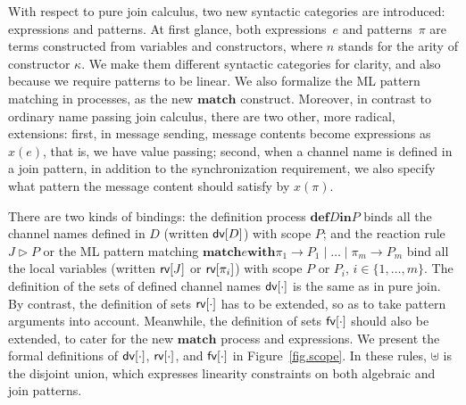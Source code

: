 \documentclass{LMCS}
\renewcommand{\exp}{e}
\newcommand{\const}{\kappa}
\newcommand{\pt}{\pi}
\newcommand{\kwd}[1]{\ensuremath{\mathbf{#1}}}
\newcommand{\prefix}[1]{\mathopen{}\mathrel{\kwd {#1}}}
\newcommand{\infix}[1]{\mathrel{\kwd {#1}}}
\newcommand{\set}[1]{\{#1\}}
\renewcommand{\_}{\mathord{\rule[-.25ex]{1ex}{.15ex}}}
\newcommand{\define}[2]{\prefix{def} #1 \infix{in} #2}
\newcommand{\matchfour}[4]{\prefix{match}  #1 \infix{with} #2_1
  \rightarrow #3_1 \mid \ldots \mid #2_{#4} \rightarrow #3_{#4}}
\newcommand{\reaction}[2]{#1 \triangleright #2}
\newcommand{\fv}[1]{\mbox{\sf fv}[#1]}
\newcommand{\dv}[1]{\mbox{\sf dv}[#1]}
\newcommand{\rv}[1]{\mbox{\sf rv}[#1]}
\begin{document}
With respect to pure join calculus, two new syntactic categories are
introduced: expressions and patterns.  At first glance, both
expressions~$e$ and patterns~$\pt$ are terms constructed from
variables and constructors, where $n$ stands for the arity of
constructor $\const$.  We make them different syntactic categories
for clarity, and also because we require patterns to be linear. We
also formalize the ML pattern matching in processes, as the new
\kwd{match} construct.  Moreover, in contrast to ordinary name passing
join calculus, there are two other, more radical, extensions: first,
in message sending, message contents become expressions as $x(\exp)$,
that is, we have value passing; second, when a channel name is defined
in a join pattern, in addition to the synchronization requirement, we
also specify what pattern the message content should satisfy by
$x(\pt)$.

There are two kinds of bindings: the definition process
$\define{D}{P}$ binds all the channel names defined in $D$ (written
$\dv{D}$) with scope $P$; and the reaction rule $\reaction{J}{P}$ or
the ML pattern matching $\matchfour{e}{\pi}{P}{m}$ bind all the local
variables (written $\rv{J}$ or $\rv{\pi_i}$) with scope $P$ or $P_i$,
$i \in \set{1, \ldots, m}$. The definition of the sets of defined
channel names $\dv{\cdot}$ is the same as in pure join.  By contrast,
the definition of sets $\rv{\cdot}$ has to be extended, so as to take
pattern arguments into account. Meanwhile, the definition of sets
$\fv{\cdot}$ should also be extended, to cater for the new \kwd{match}
process and expressions. We present the formal definitions of
$\dv{\cdot}$, $\rv{\cdot}$, and $\fv{\cdot}$ in
Figure~\ref{fig.scope}. In these rules, $\uplus$ is the disjoint
union, which expresses linearity constraints on both algebraic and
join patterns.
\end{document}
